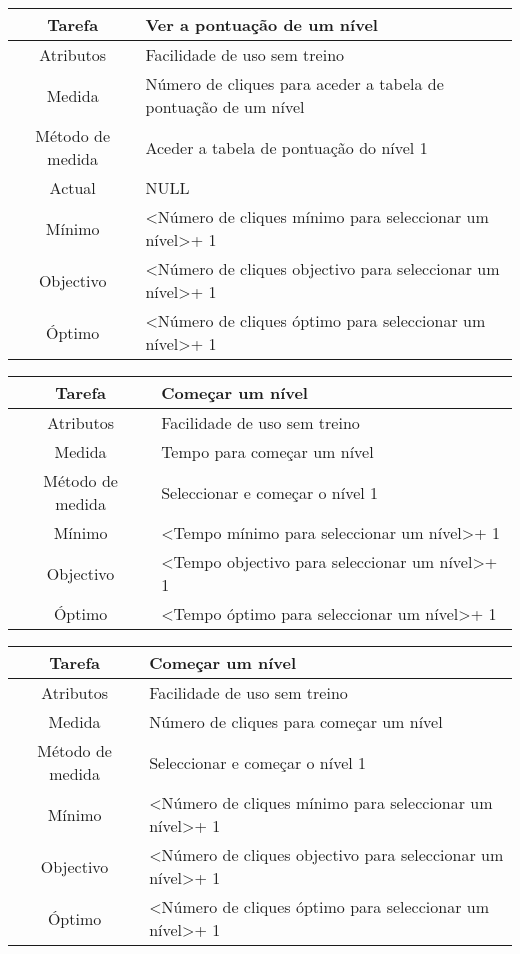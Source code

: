 \begin{center}
	\begin{tabular} {|c|p{10cm}|}
		\hline
		Tarefa & Ver a pontuação de um nível \\
		\hline
		Atributos & Facilidade de uso sem treino \\
		\hline
		Medida & Número de cliques para aceder a tabela de pontuação de um nível \\
		\hline
		Método de medida & Aceder a tabela de pontuação do nível 1 \\
		\hline
		Actual & NULL \\
		Mínimo & \textless Número de cliques mínimo para seleccionar um nível\textgreater + 1 \\
		Objectivo & \textless Número de cliques objectivo para seleccionar um nível\textgreater + 1 \\
		Óptimo & \textless Número de cliques óptimo para seleccionar um nível\textgreater + 1 \\
		\hline
	\end{tabular}
\end{center}

\begin{center}
	\begin{tabular} {|c|p{10cm}|}
		\hline
		Tarefa & Começar um nível \\
		\hline
		Atributos & Facilidade de uso sem treino \\
		\hline
		Medida & Tempo para começar um nível \\
		\hline
		Método de medida & Seleccionar e começar o nível 1 \\
		\hline
		Mínimo & \textless Tempo mínimo para seleccionar um nível\textgreater + 1 \\
		Objectivo & \textless Tempo objectivo para seleccionar um nível\textgreater + 1 \\
		Óptimo & \textless Tempo óptimo para seleccionar um nível\textgreater + 1 \\
		\hline
	\end{tabular}
\end{center}

\begin{center}
	\begin{tabular} {|c|p{10cm}|}
		\hline
		Tarefa & Começar um nível \\
		\hline
		Atributos & Facilidade de uso sem treino \\
		\hline
		Medida & Número de cliques para começar um nível \\
		\hline
		Método de medida & Seleccionar e começar o nível 1 \\
		\hline
		Mínimo & \textless Número de cliques mínimo para seleccionar um nível\textgreater + 1 \\
		Objectivo & \textless Número de cliques objectivo para seleccionar um nível\textgreater + 1 \\
		Óptimo & \textless Número de cliques óptimo para seleccionar um nível\textgreater + 1 \\
		\hline
	\end{tabular}
\end{center}


